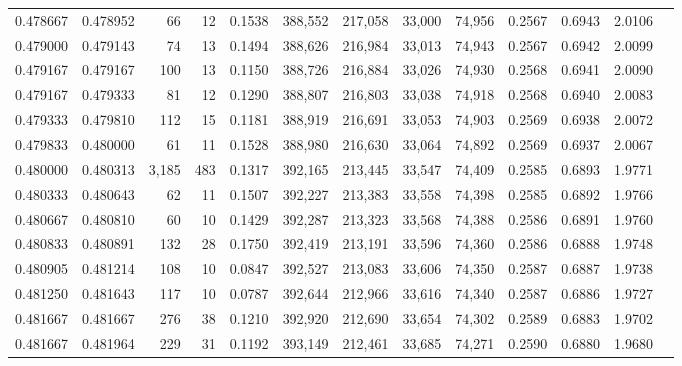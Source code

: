 \begin{tabular}{rrrrrrrrrrrrr}
0.478667 & 0.478952 &    66 &  12 &                                     0.1538 & 388,552 & 217,058 &  33,000 &  74,956 & 0.2567 & 0.6943 & 2.0106 \\
0.479000 & 0.479143 &    74 &  13 &                                     0.1494 & 388,626 & 216,984 &  33,013 &  74,943 & 0.2567 & 0.6942 & 2.0099 \\
0.479167 & 0.479167 &   100 &  13 &                                     0.1150 & 388,726 & 216,884 &  33,026 &  74,930 & 0.2568 & 0.6941 & 2.0090 \\
0.479167 & 0.479333 &    81 &  12 &                                     0.1290 & 388,807 & 216,803 &  33,038 &  74,918 & 0.2568 & 0.6940 & 2.0083 \\
0.479333 & 0.479810 &   112 &  15 &                                     0.1181 & 388,919 & 216,691 &  33,053 &  74,903 & 0.2569 & 0.6938 & 2.0072 \\
0.479833 & 0.480000 &    61 &  11 &                                     0.1528 & 388,980 & 216,630 &  33,064 &  74,892 & 0.2569 & 0.6937 & 2.0067 \\
0.480000 & 0.480313 & 3,185 & 483 &                                     0.1317 & 392,165 & 213,445 &  33,547 &  74,409 & 0.2585 & 0.6893 & 1.9771 \\
0.480333 & 0.480643 &    62 &  11 &                                     0.1507 & 392,227 & 213,383 &  33,558 &  74,398 & 0.2585 & 0.6892 & 1.9766 \\
0.480667 & 0.480810 &    60 &  10 &                                     0.1429 & 392,287 & 213,323 &  33,568 &  74,388 & 0.2586 & 0.6891 & 1.9760 \\
0.480833 & 0.480891 &   132 &  28 &                                     0.1750 & 392,419 & 213,191 &  33,596 &  74,360 & 0.2586 & 0.6888 & 1.9748 \\
0.480905 & 0.481214 &   108 &  10 &                                     0.0847 & 392,527 & 213,083 &  33,606 &  74,350 & 0.2587 & 0.6887 & 1.9738 \\
0.481250 & 0.481643 &   117 &  10 &                                     0.0787 & 392,644 & 212,966 &  33,616 &  74,340 & 0.2587 & 0.6886 & 1.9727 \\
0.481667 & 0.481667 &   276 &  38 &                                     0.1210 & 392,920 & 212,690 &  33,654 &  74,302 & 0.2589 & 0.6883 & 1.9702 \\
0.481667 & 0.481964 &   229 &  31 &                                     0.1192 & 393,149 & 212,461 &  33,685 &  74,271 & 0.2590 & 0.6880 & 1.9680 \\

\end{tabular}
